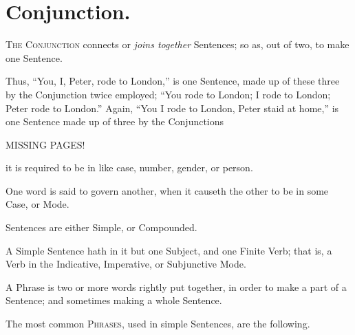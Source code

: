 \chapter{Conjunction.}

\textsc{The Conjunction} connects or \emph{joins together} Sentences; so
as, out of two, to make one Sentence.

Thus, ``You,  I,  Peter, rode to London,'' is one
Sentence, made up of these three by the Conjunction  twice
employed; ``You rode to London; I rode to London; Peter rode to
London.'' Again, ``You  I rode to London,  Peter staid
at home,'' is one Sentence made up of three by the Conjunctions 

MISSING PAGES!

it is required to be in like case, number, gender, or person.

One word is said to govern another, when it causeth the other to be in
some Case, or Mode.

Sentences are either Simple, or Compounded.

A Simple Sentence hath in it but one Subject, and one Finite Verb; that
is, a Verb in the Indicative, Imperative, or Subjunctive Mode.

A Phrase is two or more words rightly put together, in order to make a
part of a Sentence; and sometimes making a whole Sentence.

The most common \textsc{Phrases}, used in simple Sentences, are the
following.

